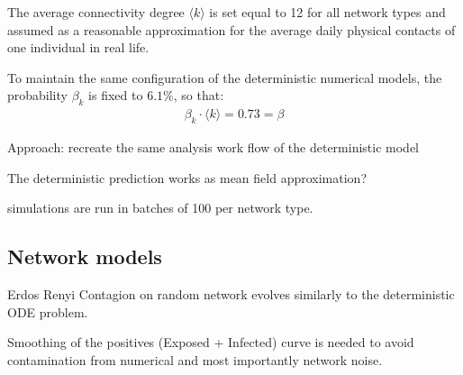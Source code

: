 \documentclass[DIV=12, BCOR=0pt]{scrartcl}  %
\begin{document}
	The average connectivity degree $\langle k \rangle$ is set equal to 12 for all network types and assumed as a reasonable approximation for the average daily physical contacts of one individual in real life. 
	
	
  To maintain the same configuration of the deterministic numerical models, the probability $\beta_k$ is fixed to $6.1 \%$, so that:
  \begin{align}
			\beta_k \cdot \langle k \rangle = 0.73 = \beta
  \end{align}
  
  Approach: recreate the same analysis work flow of the deterministic model
  
  The deterministic prediction works as mean field approximation?
%  
%  
  
  simulations are run in batches of 100 per network type.
  
  \subsection{Network models}
  Erdos Renyi
  Contagion on random network evolves similarly to the deterministic ODE problem. 
  
  Smoothing of the positives (Exposed + Infected) curve is needed to avoid contamination from numerical and most importantly network noise. 
  
\end{document}
